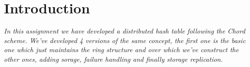 \section{Introduction}

\textit{In this assignment we have developed a distributed hash table following the Chord scheme. \newline We've developed 4 versions of the same concept, the first one is the basic one which just maintains the ring structure and over which we've construct the other ones, adding sorage, failure handling and finally storage replication.} 
